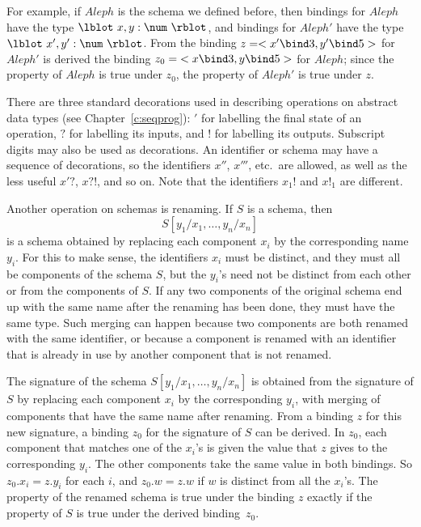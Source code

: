 \new For example, if $Aleph$ is the schema we defined before, then
bindings for $Aleph$ have the type $\lblot~x, y: \num~\rblot$, and
bindings for $Aleph'$ have the type $\lblot~x', y': \num~\rblot$.
From the binding $z = <x' \bind 3, y' \bind 5>$ for $Aleph'$ is
derived the binding $z_0 = {<x \bind 3, y \bind 5>}$ for $Aleph$; since
the property of $Aleph$ is true under $z_0$, the property of $Aleph'$
is true under $z$.

There are three standard decorations used in describing operations on abstract data
types (see
Chapter~\ref{c:seqprog}): ${}'$ for labelling the final state of an
operation, $?$ for labelling its inputs, and $!$ for labelling its
outputs.  Subscript digits may also be used as decorations.  An
identifier or schema may have a sequence of decorations, so the
identifiers $x''$, $x'''$, etc.\ are allowed, as well as the less
useful $x'?$, $x?!$, and so on.  Note that the identifiers $x_1!$ and
$x!_1$ are different.

\new Another operation on schemas is renaming.
If $S$ is a schema, then
\[ S[y_1/x_1, \ldots, y_n/x_n] \]
is a schema obtained by replacing each component $x_i$ by the
corresponding name $y_i$.  For this to make sense, the identifiers
$x_i$ must be distinct, and they must all be components of the
schema $S$, but the $y_i$'s need not be distinct from each other or
from the components of $S$.  If any two components of the original
schema end up with the same name after the renaming has been done,
they must have the same type.  Such merging can happen because two
components are both renamed with the same identifier, or because a
component is renamed with an identifier that is already in use by
another component that is not renamed.

\new The signature of the schema $S[y_1/x_1, \ldots, y_n/x_n]$ is
obtained from the signature of $S$ by replacing each component $x_i$
by the corresponding $y_i$, with
merging of components that have the same name after renaming.  From
a binding $z$ for this new signature, a binding $z_0$ for the
signature of $S$ can be derived.
In $z_0$, each component that matches one of the $x_i$'s is given
the value that $z$ gives to the corresponding $y_i$. 
The other components take the same value in both bindings.
So $z_0.x_i = z.y_i$ for each $i$, and $z_0.w = z.w$ if $w$ is
distinct from all the $x_i$'s.
The property of the renamed schema is true under the binding $z$
exactly if the property of $S$ is true under the derived binding~$z_0$.


